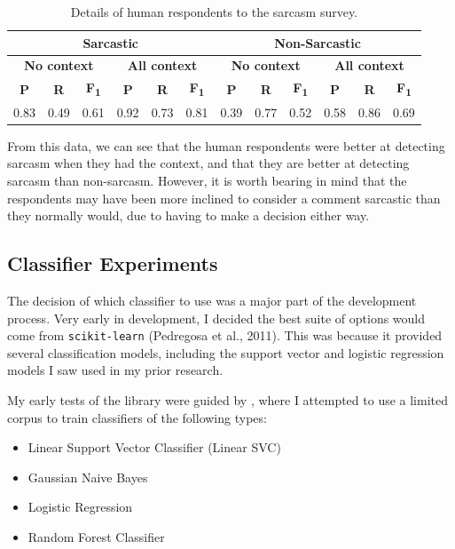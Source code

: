 \documentclass[a4paper,12pt]{article}
\begin{document}
\begin{table}[h!]
\begin{tabular}{|c|c|c|c|c|c|c|c|c|c|c|c|}
\hline
\multicolumn{6}{|c|}{\textbf{Sarcastic}}                                                                      & \multicolumn{6}{c|}{\textbf{Non-Sarcastic}}                                                                   \\ \hline
\multicolumn{3}{|c|}{\textbf{No context}}             & \multicolumn{3}{c|}{\textbf{All context}}             & \multicolumn{3}{c|}{\textbf{No context}}              & \multicolumn{3}{c|}{\textbf{All context}}             \\ \hline
\textbf{P} & \textbf{R} & \textbf{F\textsubscript{1}} & \textbf{P} & \textbf{R} & \textbf{F\textsubscript{1}} & \textbf{P} & \textbf{R} & \textbf{F\textsubscript{1}} & \textbf{P} & \textbf{R} & \textbf{F\textsubscript{1}} \\ \hline
0.83       & 0.49       & 0.61                        & 0.92       & 0.73       & 0.81                        & 0.39       & 0.77       & 0.52                        & 0.58       & 0.86       & 0.69                        \\ \hline
\end{tabular}
\caption{Details of human respondents to the sarcasm survey.}
\label{tab:cmd2}
\end{table}

From this data, we can see that the human respondents were better at detecting sarcasm when they had the context, and that they are better at detecting sarcasm than non-sarcasm. However, it is worth bearing in mind that the respondents may have been more inclined to consider a comment sarcastic than they normally would, due to having to make a decision either way.

\subsection{Classifier Experiments}
The decision of which classifier to use was a major part of the development process. Very early in development, I decided the best suite of options would come from \texttt{scikit-learn} (Pedregosa et al., 2011). This was because it provided several classification models, including the support vector and logistic regression models I saw used in my prior research.

My early tests of the library were guided by \cite{singhSarcasmDetectionStep2019}, where I attempted to use a limited corpus to train classifiers of the following types:
\begin{itemize}
  \item Linear Support Vector Classifier (Linear SVC)
  \item Gaussian Naive Bayes
  \item Logistic Regression
  \item Random Forest Classifier
\end{itemize}
\end{document}
